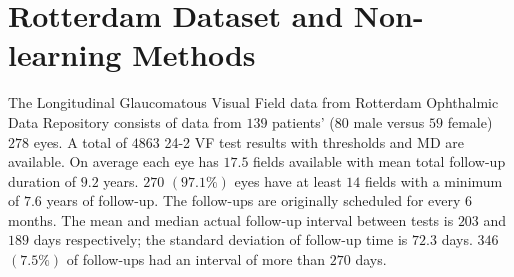 \chapter{Rotterdam Dataset and Non-learning Methods} \label{chapter:dataset}

The Longitudinal Glaucomatous Visual Field data from Rotterdam Ophthalmic Data Repository \cite{Bryan2013} consists of data from $139$ patients' ($80$ male versus $59$ female) $278$ eyes. A total of $4863$ 24-2 \acl{VF} test results with thresholds and \ac{MD} are available. On average each eye has $17.5$ fields available with mean total follow-up duration of $9.2$ years. $270$ $(97.1\%)$ eyes have at least $14$ fields with a minimum of $7.6$ years of follow-up. The follow-ups are originally scheduled for every $6$ months. The mean and median actual follow-up interval between tests is $203$ and $189$ days respectively; the standard deviation of follow-up time is $72.3$ days. $346$ $(7.5\%)$ of follow-ups had an interval of more than $270$ days. 


